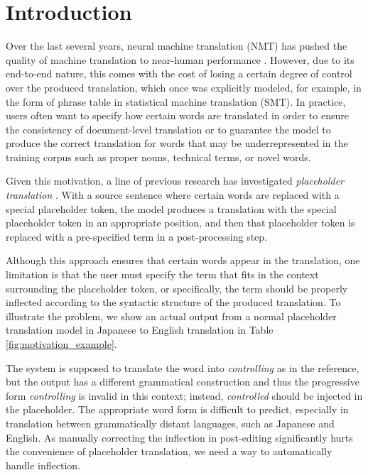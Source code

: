 \section{Introduction}
Over the last several years, neural machine translation (NMT) has pushed the quality of machine translation to near-human performance \citep{NIPS2014_a14ac55a,NIPS2017_3f5ee243}.
However, due to its end-to-end nature, this comes with the cost of losing a certain degree of control over the produced translation, which once was explicitly modeled, for example, in the form of phrase table \citep{koehn-etal-2003-statistical} in statistical machine translation (SMT).
In practice, users often want to specify how certain words are translated in order to ensure the consistency of document-level translation or to guarantee the model to produce the correct translation for words that may be underrepresented in the training corpus such as proper nouns, technical terms, or novel words.

Given this motivation, a line of previous research has investigated {\it placeholder translation} \citep{post-etal-2019-exploration}.
With a source sentence where certain words are replaced with a special placeholder token, the model produces a translation with the special placeholder token in an appropriate position, and then that placeholder token is replaced with a pre-specified term in a post-processing step.

Although this approach ensures that certain words appear in the translation, one limitation is that the user must specify the term that fits in the context surrounding the placeholder token, or specifically, the term should be properly inflected according to the syntactic structure of the produced translation.
To illustrate the problem, we show an actual output from a normal placeholder translation model in Japanese to English translation in Table \ref{fig:motivation_example}.

The system is supposed to translate the word  into {\it controlling} as in the reference, but the output has a different grammatical construction and thus the progressive form {\it controlling} is invalid in this context; instead, {\it controlled} should be injected in the placeholder.
The appropriate word form is difficult to predict, especially in translation between grammatically distant languages, such as Japanese and English. As manually correcting the inflection in post-editing significantly hurts the convenience of placeholder translation, we need a way to automatically handle inflection.

